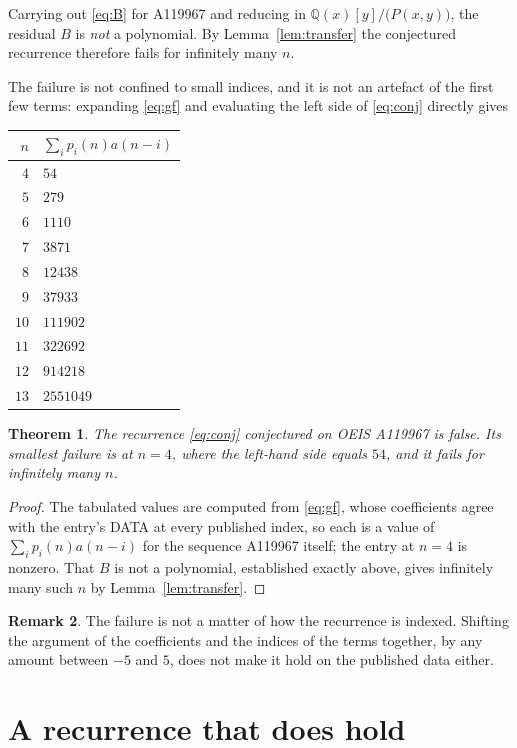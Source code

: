 \documentclass[11pt,a4paper]{article}
\theoremstyle{plain}
\newtheorem{theorem}{Theorem}
\theoremstyle{definition}
\newtheorem{remark}[theorem]{Remark}
\begin{document}
Carrying out \eqref{eq:B} for A119967 and reducing in $\mathbb{Q}(x)[y]/\bigl(P(x,y)\bigr)$, the residual $B$ is
\emph{not} a polynomial. By Lemma~\ref{lem:transfer} the conjectured recurrence therefore
fails for infinitely many $n$.

The failure is not confined to small indices, and it is not an artefact of the first few
terms: expanding \eqref{eq:gf} and evaluating the left side of \eqref{eq:conj} directly
gives

\begin{center}
\begin{tabular}{r@{\qquad}l}
$n$ & $\sum_{i}p_{i}(n)a(n-i)$ \\ \hline
$4$ & $54$ \\
$5$ & $279$ \\
$6$ & $1110$ \\
$7$ & $3871$ \\
$8$ & $12438$ \\
$9$ & $37933$ \\
$10$ & $111902$ \\
$11$ & $322692$ \\
$12$ & $914218$ \\
$13$ & $2551049$
\end{tabular}
\end{center}

\begin{theorem}
The recurrence \eqref{eq:conj} conjectured on OEIS A119967 is false. Its smallest failure
is at $n=4$, where the left-hand side equals $54$, and it fails for
infinitely many $n$.
\end{theorem}

\begin{proof}
The tabulated values are computed from \eqref{eq:gf}, whose coefficients agree with the
entry's DATA at every published index, so each is a value of $\sum_{i}p_{i}(n)a(n-i)$ for
the sequence A119967 itself; the entry at $n=4$ is nonzero. That $B$ is not a
polynomial, established exactly above, gives infinitely many such $n$ by
Lemma~\ref{lem:transfer}.
\end{proof}

\begin{remark}
The failure is not a matter of how the recurrence is indexed. Shifting the argument of the coefficients and the indices of the terms together, by any amount between $-5$ and $5$, does not make it hold on the published data either.
\end{remark}

\section{A recurrence that does hold}
\end{document}

